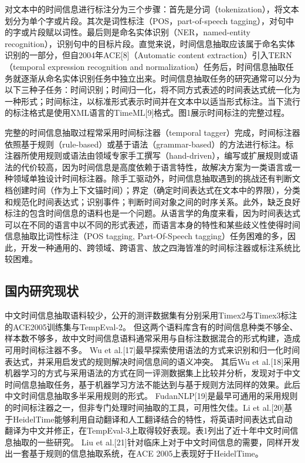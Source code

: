 对文本中的时间信息进行标注分为三个步骤：首先是分词（tokenization），将文本划分为单个字或片段。其次是词性标注（POS，part-of-speech tagging），对句中的字或片段赋以词性。最后则是命名实体识别（NER，named-entity recognition），识别句中的目标片段。直觉来说，时间信息抽取应该属于命名实体识别的一部分，但自2004年ACE[8]（Automatic content extraction）引入TERN（temporal expression recognition and normalization）任务后，时间信息抽取任务就逐渐从命名实体识别任务中独立出来。时间信息抽取任务的研究通常可以分为以下三种子任务：时间识别；时间归一化，将不同方式表述的时间表达式统一化为一种形式；时间标注，以标准形式表示时间并在文本中以适当形式标注。当下流行的标注格式是使用XML语言的TimeML[9]格式。图1展示时间标注的完整过程。

完整的时间信息抽取过程常采用时间标注器（temporal tagger）完成，时间标注器依照基于规则（rule-based）或基于语法（grammar-based）的方法进行标注。标注器所使用规则或语法由领域专家手工撰写（hand-driven），编写或扩展规则或语法的代价较高，因为时间信息是高度依赖于语言特性，故解决方案为一类语言或一种领域单独设计时间标注器。除手工驱动外，时间信息抽取遇到的挑战还有判断文档创建时间（作为上下文锚时间）；界定（确定时间表达式在文本中的界限），分类和规范化时间表达式；识别事件；判断时间对象之间的时序关系。此外，缺乏良好标注的包含时间信息的语料也是一个问题。从语言学的角度来看，因为时间表达式可以在不同的语言中以不同的形式表述，而语言本身的特性和某些歧义性使得时间信息抽取比词性标注（POS tagging, Part-Of-Speech tagging）任务困难的多，因此，开发一种通用的、跨领域、跨语言、放之四海皆准的时间标注器或标注系统比较困难。

\subsection{国内研究现状}

中文时间信息抽取语料较少，公开的测评数据集有分别采用Timex2与Timex3标注的ACE2005训练集与TempEval-2。
但这两个语料库含有的时间信息种类不够全、样本数不够多，故中文时间信息语料通常采用与自标注数据混合的形式构建，造成可用时间标注器不多。
Wu et al.[17]最早探索使用语法的方式来识别和归一化时间表达式，并采用启发式的规则解决时间信息间的语义冲突。
其后Wu et al.[18]采用机器学习的方式与采用语法的方式在同一评测数据集上比较并分析，发现对于中文时间信息抽取任务，基于机器学习方法不能达到与基于规则方法同样的效果。此后中文时间信息抽取多半采用规则的形式。
FudanNLP[19]是最早可通用的采用规则的时间标注器之一，但非专门处理时间抽取的工具，可用性欠佳。Li et al.[20]基于HeidelTime能够利用自动翻译和人工翻译结合的特性，将英语时间表达式自动翻译为中文并修正，在TempEval-3上取得较好表现。表1列出了近十年中文时间信息抽取的一些研究。
Liu et al.[21]针对临床上对于中文时间信息的需要，同样开发出一套基于规则的信息抽取系统，在ACE 2005上表现好于HeidelTime。


